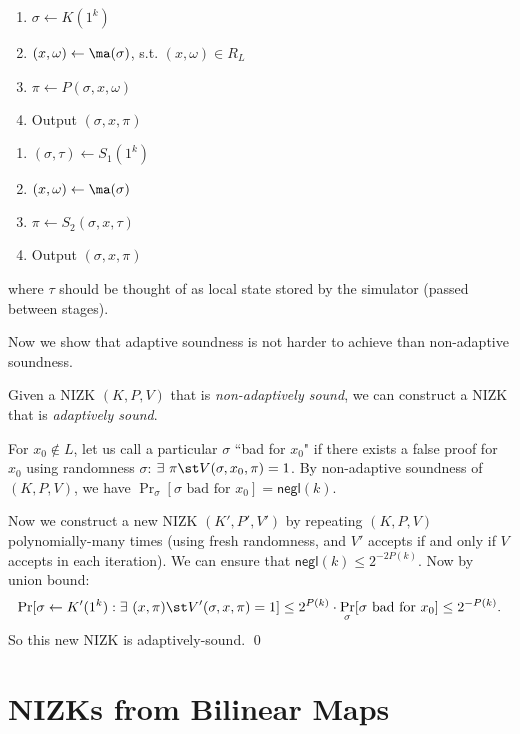 \medskip
\begin{minipage}{0.5\textwidth}
    \begin{enumerate}[itemsep=0pt]
        \item $\sigma \gets K(1^k)$
        \item $(x, \omega) \gets \ma(\sigma)$, s.t. $(x, \omega) \in R_L$
        \item $\pi \gets P(\sigma, x, \omega)$
        \item Output $(\sigma, x, \pi)$
    \end{enumerate}
\end{minipage}
\begin{minipage}{0.5\textwidth}
    \begin{enumerate}[itemsep=0pt]
        \item $(\sigma, \tau) \gets S_1(1^k)$
        \item $(x, \omega) \gets \ma(\sigma)$
        \item $\pi \gets S_2(\sigma, x, \tau)$
        \item Output $(\sigma, x, \pi)$
    \end{enumerate}
\end{minipage}

\medskip
\noindent where $\tau$ should be thought of as local state stored by the simulator (passed
    between stages).

\bigskip
Now we show that adaptive soundness is not harder to achieve than non-adaptive soundness.
\begin{theorem}\label{thm:amplify-soundness}
    Given a NIZK $(K, P, V)$ that is \emph{non-adaptively sound}, we can
    construct a NIZK \DIFaddbegin {}\DIFaddend that is \emph{adaptively sound}.
\end{theorem}
\proof
For $x_0 \not\in L$, let us call a particular $\sigma$ ``bad for $x_0$" if 
there exists a false proof for $x_0$ using randomness $\sigma$:
$\exists~ \pi \st V(\sigma, x_0, \pi) = 1$.
By non-adaptive soundness of $(K, P, V)$, we have
$\Pr_\sigma[\sigma \text{ bad for } x_0] = \mathsf{negl}(k)$.

Now we construct a new NIZK $(K',P',V')$ by repeating $(K,P,V)$ polynomially-many times
(using fresh randomness, and $V'$ accepts if and only if $V$ accepts in each iteration).
We can ensure that $\mathsf{negl}(k) \leq 2^{-2P(k)}$.
Now by union bound:
$$
\Pr[\sigma \gets K'(1^k): \exists~ (x, \pi) \st V'(\sigma, x, \pi) = 1] \leq
2^{P(k)}\cdot \Pr_\sigma[\sigma \text{ bad for } x_0] \leq 2^{-P(k)}.$$
So this new NIZK is adaptively-sound. \qed

\section{NIZKs from Bilinear Maps}


